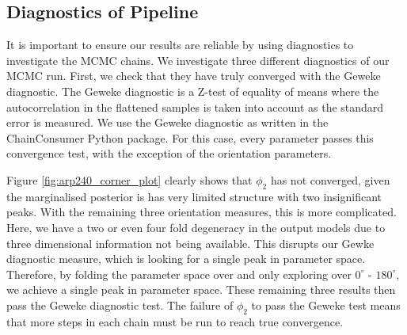 \subsection{Diagnostics of Pipeline}
\noindent It is important to ensure our results are reliable by using diagnostics to investigate the MCMC chains. We investigate three different diagnostics of our MCMC run. First, we check that they have truly converged with the Geweke diagnostic. The Geweke diagnostic is a Z-test of equality of means where the autocorrelation in the flattened samples is taken into account as the standard error is measured. We use the Geweke diagnostic as written in the ChainConsumer \citep{2016JOSS....1...45H} Python package. For this case, every parameter passes this convergence test, with the exception of the orientation parameters.

Figure \ref{fig:arp240_corner_plot} clearly shows that $\phi_{2}$ has not converged, given the marginalised posterior is has very limited structure with two insignificant peaks. With the remaining three orientation measures, this is more complicated. Here, we have a two or even four fold degeneracy in the output models due to three dimensional information not being available. This disrupts our Gewke diagnostic measure, which is looking for a single peak in parameter space. Therefore, by folding the parameter space over and only exploring over $0^{\circ}$ - $180^{\circ}$, we achieve a single peak in parameter space. These remaining three results then pass the Geweke diagnostic test. The failure of $\phi_{2}$ to pass the Geweke test means that more steps in each chain must be run to reach true convergence.

